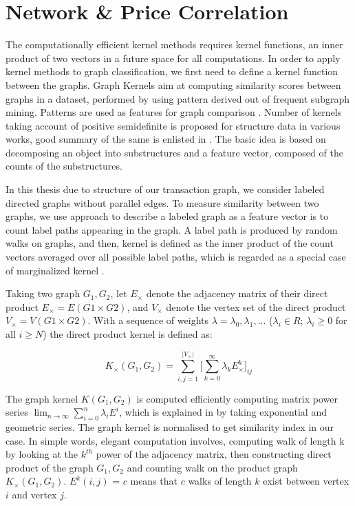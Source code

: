 \documentclass[12pt,a4paper]{article}
\numberwithin{equation}{section}
\numberwithin{figure}{section}
\numberwithin{table}{section}
\begin{document}
\section{Network \& Price Correlation}

The computationally efficient kernel methods requires kernel functions, an inner product of two vectors in a future space for all computations. In order to apply kernel methods to graph classification, we first need to define a kernel function between the graphs. Graph Kernels aim at computing similarity scores between graphs in a dataset, performed by using pattern derived out of  frequent subgraph mining. Patterns are used as features for graph comparison \citep{Deshpande2005}. Number of kernels taking account of positive semidefinite is proposed for structure data in various works, good summary of the same is enlisted in \citet{Vishwanathan2010}. The basic idea is based on decomposing an object into substructures and a feature vector, composed of the counts of the substructures. 

In this thesis due to structure of our transaction graph, we consider labeled directed graphs without parallel edges. To measure similarity between two graphs, we use \citet{Gartner2003} approach to describe a labeled graph as a
feature vector is to count label paths appearing in the graph.  A label path is produced by random walks on graphs, and then, kernel is defined as the inner product of the count vectors averaged over all possible label paths, which is regarded as a special case of marginalized kernel \citep{Vishwanathan2010}. 

Taking two graph $G_{1}, G_{2}$, let $E_{\times}$ denote the adjacency matrix
of their direct product $E_{\times} = E (G1 \times G2) $, and $V_{\times}$ denote the vertex set of the direct product  $V_{\times} = V (G1 \times G2) $. With a sequence of weights $\lambda = \lambda_{0}, \lambda_{1},...$
($\lambda_{i} \in R$; $\lambda_{i} \geq 0$ for all $i \geq N$) the direct product kernel is defined as:

%
\begin{equation}
K_{\times} (G_{1}, G_{2}) = \displaystyle\sum_{i,j=1}^{| V_{\times} |} \Bigg[ \displaystyle\sum_{k=0}^{\infty} \lambda_{k}E_{\times}^{k} \Bigg]_{ij}
\end{equation}
%

The graph kernel $K(G_{1}, G_{2})$ is computed efficiently computing matrix power series $\lim_{n \to \infty} \sum_{i=0}^{n} \lambda_{i}E^{i}$, which is explained in \citet{Gartner2003} by taking exponential and geometric series. The graph kernel is normalised to get similarity index in our case. In simple words, elegant computation involves, computing walk of length k by looking at the $k^{th}$ power of the adjacency matrix, then constructing direct product of the graph $G_{1}, G_{2}$ and counting walk on the product graph $K_{\times} (G_{1}, G_{2})$.  $E^{k} (i,j)$ = $c$ means that $c$ walks of length $k$ exist between vertex $i$ and vertex $j$.
\end{document}
